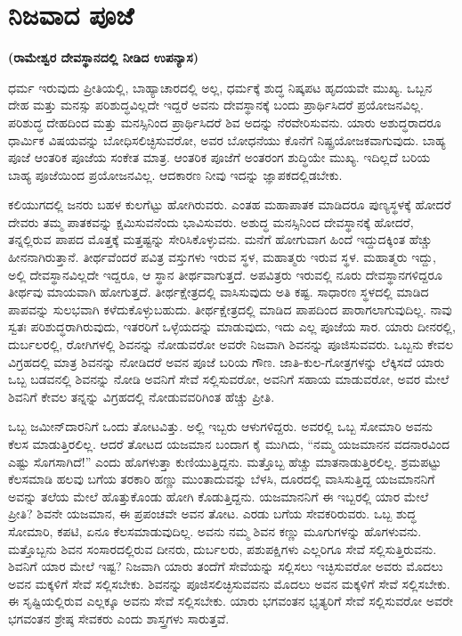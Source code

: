 
\chapter{ನಿಜವಾದ ಪೂಜೆ}

\begin{center}
\textbf{(ರಾಮೇಶ್ವರ ದೇವಸ್ಥಾನದಲ್ಲಿ ನೀಡಿದ ಉಪನ್ಯಾಸ)}
\end{center}

ಧರ್ಮ ಇರುವುದು ಪ್ರೀತಿಯಲ್ಲಿ, ಬಾಹ್ಯಾಚಾರದಲ್ಲಿ ಅಲ್ಲ, ಧರ್ಮಕ್ಕೆ ಶುದ್ಧ ನಿಷ್ಕಪಟ ಹೃದಯವೇ ಮುಖ್ಯ. ಒಬ್ಬನ ದೇಹ ಮತ್ತು ಮನಸ್ಸು ಪರಿಶುದ್ಧವಿಲ್ಲದೇ ಇದ್ದರೆ ಅವನು ದೇವಸ್ಥಾನಕ್ಕೆ ಬಂದು ಪ್ರಾರ್ಥಿಸಿದರೆ ಪ್ರಯೋಜನವಿಲ್ಲ. ಪರಿಶುದ್ಧ ದೇಹದಿಂದ ಮತ್ತು ಮನಸ್ಸಿನಿಂದ ಪ್ರಾರ್ಥಿಸಿದರೆ ಶಿವ ಅದನ್ನು ನೆರವೇರಿಸುವನು. ಯಾರು ಅಶುದ್ಧರಾದರೂ ಧಾರ್ಮಿಕ ವಿಷಯವನ್ನು ಬೋಧಿಸಲಿಚ್ಛಿಸುವರೋ, ಅವರ ಬೋಧನೆಯು ಕೊನೆಗೆ ನಿಷ್ಪ್ರಯೋಜಕವಾಗುವುದು. ಬಾಹ್ಯ ಪೂಜೆ ಆಂತರಿಕ ಪೂಜೆಯ ಸಂಕೇತ ಮಾತ್ರ. ಆಂತರಿಕ ಪೂಜೆಗೆ ಅಂತರಂಗ ಶುದ್ಧಿಯೇ ಮುಖ್ಯ. ಇದಿಲ್ಲದೆ ಬರಿಯ ಬಾಹ್ಯ ಪೂಜೆಯಿಂದ ಪ್ರಯೋಜನವಿಲ್ಲ. ಆದಕಾರಣ ನೀವು ಇದನ್ನು ಜ್ಞಾಪಕದಲ್ಲಿಡಬೇಕು.

ಕಲಿಯುಗದಲ್ಲಿ ಜನರು ಬಹಳ ಕುಲಗೆಟ್ಟು ಹೋಗಿರುವರು. ಎಂತಹ ಮಹಾಪಾತಕ ಮಾಡಿದರೂ ಪುಣ್ಯಸ್ಥಳಕ್ಕೆ ಹೋದರೆ ದೇವರು ತಮ್ಮ ಪಾತಕವನ್ನು ಕ್ಷಮಿಸುವನೆಂದು ಭಾವಿಸುವರು. ಅಶುದ್ಧ ಮನಸ್ಸಿನಿಂದ ದೇವಸ್ಥಾನಕ್ಕೆ ಹೋದರೆ, ತನ್ನಲ್ಲಿರುವ ಪಾಪದ ಮೊತ್ತಕ್ಕೆ ಮತ್ತಷ್ಟನ್ನು ಸೇರಿಸಿಕೊಳ್ಳುವನು. ಮನೆಗೆ ಹೋಗುವಾಗ ಹಿಂದೆ ಇದ್ದುದಕ್ಕಿಂತ ಹೆಚ್ಚು ಹೀನನಾಗಿರುತ್ತಾನೆ. ತೀರ್ಥವೆಂದರೆ ಪವಿತ್ರ ವಸ್ತುಗಳು ಇರುವ ಸ್ಥಳ, ಮಹಾತ್ಮರು ಇರುವ ಸ್ಥಳ. ಮಹಾತ್ಮರು ಇದ್ದು, ಅಲ್ಲಿ ದೇವಸ್ಥಾನವಿಲ್ಲದೇ ಇದ್ದರೂ, ಆ ಸ್ಥಾನ ತೀರ್ಥವಾಗುತ್ತದೆ. ಅಪವಿತ್ರರು ಇರುವಲ್ಲಿ ನೂರು ದೇವಸ್ಥಾನಗಳಿದ್ದರೂ ತೀರ್ಥವು ಮಾಯವಾಗಿ ಹೋಗುತ್ತದೆ. ತೀರ್ಥಕ್ಷೇತ್ರದಲ್ಲಿ ವಾಸಿಸುವುದು ಅತಿ ಕಷ್ಟ. ಸಾಧಾರಣ ಸ್ಥಳದಲ್ಲಿ ಮಾಡಿದ ಪಾಪವನ್ನು ಸುಲಭವಾಗಿ ಕಳೆದುಕೊಳ್ಳುಬಹುದು. ತೀರ್ಥಕ್ಷೇತ್ರದಲ್ಲಿ ಮಾಡಿದ ಪಾಪದಿಂದ ಪಾರಾಗಲಾಗುವುದಿಲ್ಲ. ನಾವು ಸ್ವತಃ ಪರಿಶುದ್ಧರಾಗಿರುವುದು, ಇತರರಿಗೆ ಒಳ್ಳೆಯದನ್ನು ಮಾಡುವುದು, ಇದು ಎಲ್ಲ ಪೂಜೆಯ ಸಾರ. ಯಾರು ದೀನರಲ್ಲಿ, ದುರ್ಬಲರಲ್ಲಿ, ರೋಗಿಗಳಲ್ಲಿ ಶಿವನನ್ನು ನೋಡುವರೋ ಅವರೇ ನಿಜವಾಗಿ ಶಿವನನ್ನು ಪೂಜಿಸುವವರು. ಒಬ್ಬನು ಕೇವಲ ವಿಗ್ರಹದಲ್ಲಿ ಮಾತ್ರ ಶಿವನನ್ನು ನೋಡಿದರೆ ಅವನ ಪೂಜೆ ಬರಿಯ ಗೌಣ. ಜಾತಿ-ಕುಲ-ಗೋತ್ರಗಳನ್ನು ಲೆಕ್ಕಿಸದೆ ಯಾರು ಒಬ್ಬ ಬಡವನಲ್ಲಿ ಶಿವನನ್ನು ನೋಡಿ ಅವನಿಗೆ ಸೇವೆ ಸಲ್ಲಿಸುವರೋ, ಅವನಿಗೆ ಸಹಾಯ ಮಾಡುವರೋ, ಅವರ ಮೇಲೆ ಶಿವನಿಗೆ ಕೇವಲ ತನ್ನನ್ನು ವಿಗ್ರಹದಲ್ಲಿ ನೋಡುವವರಿಗಿಂತ ಹೆಚ್ಚು ಪ್ರೀತಿ.

ಒಬ್ಬ ಜಮೀನ್​ದಾರನಿಗೆ ಒಂದು ತೋಟವಿತ್ತು. ಅಲ್ಲಿ ಇಬ್ಬರು ಆಳುಗಳಿದ್ದರು. ಅವರಲ್ಲಿ ಒಬ್ಬ ಸೋಮಾರಿ ಅವನು ಕೆಲಸ ಮಾಡುತ್ತಿರಲಿಲ್ಲ. ಆದರೆ ತೋಟದ ಯಜಮಾನ ಬಂದಾಗ ಕೈ ಮುಗಿದು, “ನಮ್ಮ ಯಜಮಾನನ ವದನಾರವಿಂದ ಎಷ್ಟು ಸೊಗಸಾಗಿದೆ!” ಎಂದು ಹೊಗಳುತ್ತಾ ಕುಣಿಯುತ್ತಿದ್ದನು. ಮತ್ತೊಬ್ಬ ಹೆಚ್ಚು ಮಾತನಾಡುತ್ತಿರಲಿಲ್ಲ. ಶ್ರಮಪಟ್ಟು ಕೆಲಸಮಾಡಿ ಹಲವು ಬಗೆಯ ತರಕಾರಿ ಹಣ್ಣು ಮುಂತಾದುವನ್ನು ಬೆಳಸಿ, ದೂರದಲ್ಲಿ ವಾಸಿಸುತ್ತಿದ್ದ ಯಜಮಾನನಿಗೆ ಅವನ್ನು ತಲೆಯ ಮೇಲೆ ಹೊತ್ತುಕೊಂಡು ಹೋಗಿ ಕೊಡುತ್ತಿದ್ದನು. ಯಜಮಾನನಿಗೆ ಈ ಇಬ್ಬರಲ್ಲಿ ಯಾರ ಮೇಲೆ ಪ್ರೀತಿ? ಶಿವನೇ ಯಜಮಾನ, ಈ ಪ್ರಪಂಚವೇ ಅವನ ತೋಟ. ಎರಡು ಬಗೆಯ ಸೇವಕರಿರುವರು. ಒಬ್ಬ ಶುದ್ಧ ಸೋಮಾರಿ, ಕಪಟಿ, ಏನೂ ಕೆಲಸಮಾಡುವುದಿಲ್ಲ. ಅವನು ನಮ್ಮ ಶಿವನ ಕಣ್ಣು ಮೂಗುಗಳನ್ನು ಹೊಗಳುವನು. ಮತ್ತೊಬ್ಬನು ಶಿವನ ಸಂಸಾರದಲ್ಲಿರುವ ದೀನರು, ದುರ್ಬಲರು, ಪಶುಪಕ್ಷಿಗಳು ಎಲ್ಲರಿಗೂ ಸೇವೆ ಸಲ್ಲಿಸುತ್ತಿರುವನು. ಶಿವನಿಗೆ ಯಾರ ಮೇಲೆ ಇಷ್ಟ? ನಿಜವಾಗಿ ಯಾರು ತಂದೆಗೆ ಸೇವೆಯನ್ನು ಸಲ್ಲಿಸಲು ಇಚ್ಛಿಸುವರೋ ಅವರು ಮೊದಲು ಅವನ ಮಕ್ಕಳಿಗೆ ಸೇವೆ ಸಲ್ಲಿಸಬೇಕು. ಶಿವನನ್ನು ಪೂಜಿಸಲಿಚ್ಛಿಸುವವನು ಮೊದಲು ಅವನ ಮಕ್ಕಳಿಗೆ ಸೇವೆ ಸಲ್ಲಿಸಬೇಕು. ಈ ಸೃಷ್ಟಿಯಲ್ಲಿರುವ ಎಲ್ಲಕ್ಕೂ ಅವನು ಸೇವೆ ಸಲ್ಲಿಸಬೇಕು. ಯಾರು ಭಗವಂತನ ಭೃತ್ಯರಿಗೆ ಸೇವೆ ಸಲ್ಲಿಸುವರೋ ಅವರೇ ಭಗವಂತನ ಶ್ರೇಷ್ಠ ಸೇವಕರು ಎಂದು ಶಾಸ್ತ್ರಗಳು ಸಾರುತ್ತವೆ.

